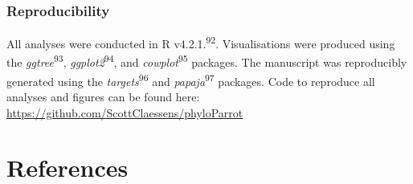\documentclass[
  man, donotrepeattitle,floatsintext]{apa6}
\begin{document}
\hypertarget{reproducibility}{%
\subsubsection{Reproducibility}\label{reproducibility}}

All analyses were conducted in R v4.2.1.\textsuperscript{92}. Visualisations were
produced using the \emph{ggtree}\textsuperscript{93}, \emph{ggplot2}\textsuperscript{94}, and \emph{cowplot}\textsuperscript{95} packages. The manuscript was reproducibly generated using the
\emph{targets}\textsuperscript{96} and \emph{papaja}\textsuperscript{97} packages. Code to reproduce all
analyses and figures can be found here:
\url{https://github.com/ScottClaessens/phyloParrot}

\newpage

\hypertarget{references}{%
\section{References}\label{references}}

\begingroup
\end{document}
